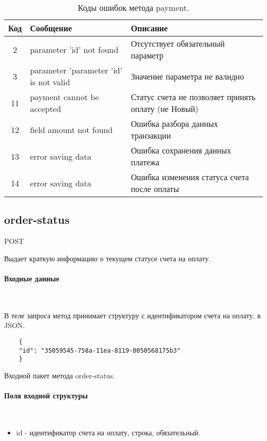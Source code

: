 \documentclass[11pt, a4paper]{article}
\begin{document}
\begin{table}[H]
	\centering
	
	\begin{tabular}{| c | p{7cm} | p{8cm} |}
		\hline
		Код & Сообщение & Описание \\
		\hline
		2 & parameter 'id' not found & Отсутствует обязательный параметр \\
		3 & parameter 'parameter 'id' is not valid & Значение параметра не валидно \\
		11 & payment cannot be accepted & Статус счета не позволяет принять оплату (не Новый) \\
		12 & field amount not found & Ошибка разбора данных транзакции \\
		13 & error saving data & Ошибка сохранения данных платежа \\
		14 & error saving data & Ошибка изменения статуса счета после оплаты \\
		\hline
	\end{tabular}
	\caption{Коды ошибок метода payment.}
\end{table}

\subsection{order-status}
POST

Выдает краткую информацию о текущем статусе счета на оплату.

\paragraph{Входные данные}\

В теле запроса метод принимает структуру с идентификатором счета на оплату, в JSON.

\begin{listing}[H]
	\begin{verbatim}
	{
	"id": "35059545-758a-11ea-8119-0050568175b3"
	}
	\end{verbatim}
	\caption{Входной пакет метода order-status.} 
\end{listing}

\paragraph{Поля входной структуры}\

\begin{itemize}
	\item id - идентификатор счета на оплату, строка, обязательный.
\end{itemize}
\end{document}
